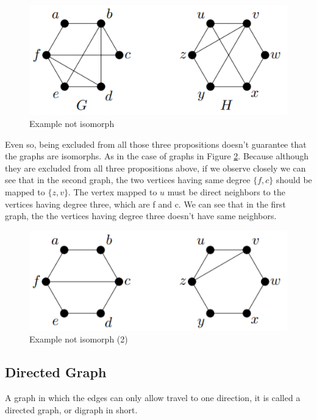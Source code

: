 \documentclass{article}
\theoremstyle{plain}%
\theoremstyle{definition}
\theoremstyle{remark}
\begin{document}
	\begin{figure}[htbp]
		\center
		\includegraphics[scale=0.4]{img/graph-not-isomorphic-a.png}
		\caption{Example not isomorph}
		\label{fig-ex-isomorphism-3}
	\end{figure}

	Even so, being excluded from all those three propositions doesn't guarantee that the graphs are isomorphs. As in the case of graphs in Figure \ref{fig-ex-isomorphism-4}. Because although they are excluded from all three propositions above, if we observe closely we can see that in the second graph, the two vertices having same degree $\{f, c\}$ should be mapped to $\{z, v\}$. The vertex mapped to $u$ must be direct neighbors to the vertices having degree three, which are f and c. We can see that in the first graph, the the vertices having degree three doesn't have same neighbors.

	\begin{figure}[htbp]
		\center
		\includegraphics[scale=0.4]{img/graph-not-isomorphic-b.png}
		\caption{Example not isomorph (2)}
		\label{fig-ex-isomorphism-4}
	\end{figure}

	\subsection{Directed Graph}

	A graph in which the edges can only allow travel to one direction, it is called a directed graph, or digraph in short.
\end{document}
